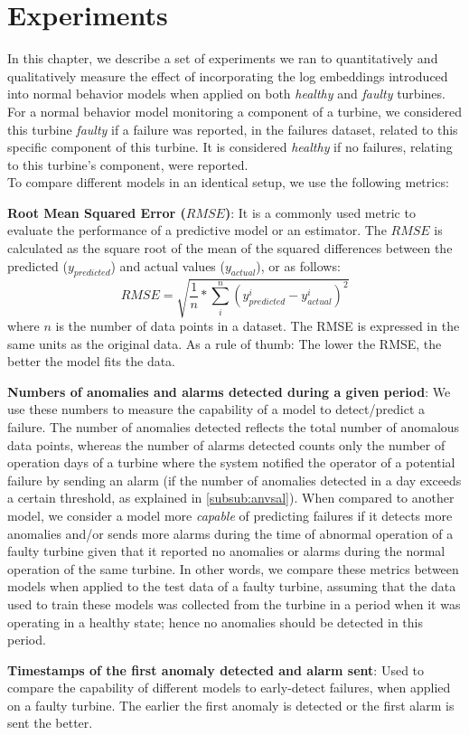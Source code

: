 \chapter{Experiments}
\label{chap:experiments}
In this chapter, we describe a set of experiments we ran to quantitatively and qualitatively measure the effect of incorporating the log embeddings introduced into normal behavior models
when applied on both \emph{healthy} and \emph{faulty} turbines. For a normal behavior model monitoring a component of a turbine, we considered this turbine \emph{faulty} if 
a failure was reported, in the failures dataset, related to this specific component of this turbine. It is considered \emph{healthy} if no failures, relating to this turbine's component,
were reported.\\
To compare different models in an identical setup, we use the following metrics:
\begin{bulletList}
    \item \textbf{Root Mean Squared Error ($RMSE$)}: It is a commonly used metric to evaluate the performance of a predictive model or an estimator.
    The $RMSE$ is calculated as the square root of the mean of the squared differences between the predicted ($y_{predicted}$) and actual values ($y_{actual}$), or as follows:
    \begin{equation}
        RMSE = \sqrt{\frac{1}{n} * \sum_{i}^{n} (y_{predicted}^i - y_{actual}^i)^2}
    \end{equation}
    where $n$ is the number of data points in a dataset. The RMSE is expressed in the same units as the original data. 
    As a rule of thumb: The lower the RMSE, the better the model fits the data.
    \item \textbf{Numbers of anomalies and alarms detected during a given period}: We use these numbers to measure the capability of a model to detect/predict a failure. 
    The number of anomalies detected reflects the total number of anomalous data points, whereas the number of alarms detected counts only the number of operation days of a turbine 
    where the system notified the operator of a potential failure by sending an alarm (if the number of anomalies detected in a day exceeds a certain threshold, 
    as explained in \ref{subsub:anvsal}). When compared to another model, we consider a model more \emph{capable} of predicting failures if it 
    detects more anomalies and/or sends more alarms during the time of abnormal operation of a faulty turbine given that it reported no anomalies or alarms during the normal operation 
    of the same turbine. In other words, we compare these metrics between models when applied to the test data of a faulty turbine, assuming that the data used to train these models 
    was collected from the turbine in a period when it was operating in a healthy state; hence no anomalies should be detected in this period.
    \item \textbf{Timestamps of the first anomaly detected and alarm sent}: Used to compare the capability of different models to early-detect failures, when applied on a faulty turbine. The earlier
    the first anomaly is detected or the first alarm is sent the better.
\end{bulletList}
